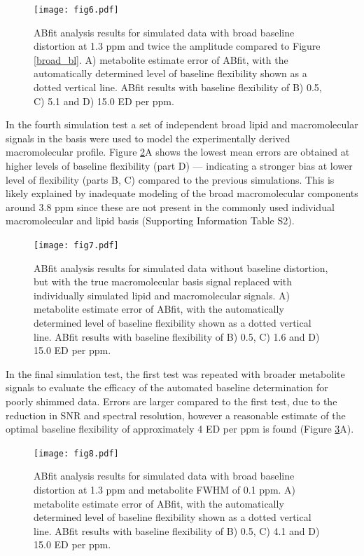 \documentclass[num-refs]{wiley-article}
\begin{document}
\begin{figure}
  \begin{center}
    \texttt{[image: fig6.pdf]}
    \caption{ABfit analysis results for simulated data with broad baseline distortion at 1.3 ppm and twice the amplitude compared to Figure \ref{broad_bl}. A) metabolite estimate error of ABfit, with the automatically determined level of baseline flexibility shown as a dotted vertical line. ABfit results with baseline flexibility of B) 0.5, C) 5.1 and D) 15.0 ED per ppm.}
    \label{big_broad_bl}
  \end{center}
\end{figure}

In the fourth simulation test a set of independent broad lipid and macromolecular signals in the basis were used to model the experimentally derived macromolecular profile. Figure \ref{sim_lip_mm_basis}A shows the lowest mean errors are obtained at higher levels of baseline flexibility (part D) --- indicating a stronger bias at lower level of flexibility (parts B, C) compared to the previous simulations. This is likely explained by inadequate modeling of the broad macromolecular components around 3.8 ppm since these are not present in the commonly used individual macromolecular and lipid basis (Supporting Information Table S2).

\begin{figure}
  \begin{center}
    \texttt{[image: fig7.pdf]}
    \caption{ABfit analysis results for simulated data without baseline distortion, but with the true macromolecular basis signal replaced with individually simulated lipid and macromolecular signals. A) metabolite estimate error of ABfit, with the automatically determined level of baseline flexibility shown as a dotted vertical line. ABfit results with baseline flexibility of B) 0.5, C) 1.6 and D) 15.0 ED per ppm.}
    \label{sim_lip_mm_basis}
  \end{center}
\end{figure}

In the final simulation test, the first test was repeated with broader metabolite signals to evaluate the efficacy of the automated baseline determination for poorly shimmed data. Errors are larger compared to the first test, due to the reduction in SNR and spectral resolution, however a reasonable estimate of the optimal baseline flexibility of approximately 4 ED per ppm is found (Figure \ref{broad_bl_bad_shim}A).

\begin{figure}
  \begin{center}
    \texttt{[image: fig8.pdf]}
    \caption{ABfit analysis results for simulated data with broad baseline distortion at 1.3 ppm and metabolite FWHM of 0.1 ppm. A) metabolite estimate error of ABfit, with the automatically determined level of baseline flexibility shown as a dotted vertical line. ABfit results with baseline flexibility of B) 0.5, C) 4.1 and D) 15.0 ED per ppm.}
    \label{broad_bl_bad_shim}
  \end{center}
\end{figure}
\end{document}
